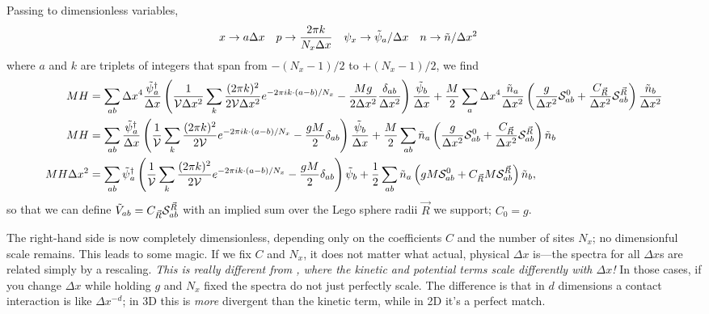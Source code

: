 Passing to dimensionless variables,
\begin{align}
	x & \rightarrow a \Delta x
	&
	p &\rightarrow \frac{2\pi k}{N_x \Delta x}
	&
	\psi_x & \rightarrow \tilde{\psi}_a / \Delta x
	&
	n &\rightarrow \tilde{n} / \Delta x^2
\end{align}
where $a$ and $k$ are triplets of integers that span from $-(N_x-1)/2$ to $+(N_x-1)/2$, we find
\begin{align}
	MH &= 
		\sum_{ab}\Delta x^4 \frac{\tilde{\psi}{}^{\dagger}_a}{\Delta x} \left(
				\frac{1}{\mathcal{V} \Delta x^2} \sum_{k} \frac{(2\pi k)^2}{2 \mathcal{V} \Delta x^2} e^{-2\pi i k \cdot(a-b)/N_x} 
				- \frac{Mg}{2\Delta x^2} \frac{\delta_{ab}}{\Delta x^2}
			\right) \frac{\tilde{\psi}_b}{\Delta x}
		+ \frac{M}{2} \sum_{a} \Delta x^4 \frac{\tilde{n}_a}{\Delta x^2} \left(
				\frac{g}{\Delta x^2} \mathcal{S}^{0}_{ab}
				+ \frac{C_{\vec{R}}}{\Delta x^2} \mathcal{S}^{\vec{R}}_{ab}
			\right) \frac{\tilde{n}_b}{\Delta x^2}
	\\
	MH &=
		\sum_{ab}\frac{\tilde{\psi}{}^{\dagger}_a}{\Delta x} \left(
			\frac{1}{\mathcal{V}} \sum_{k} \frac{(2\pi k)^2}{2 \mathcal{V}} e^{-2\pi i k \cdot(a-b)/N_x} 
			- \frac{gM}{2} \delta_{ab}
			\right) \frac{\tilde{\psi}_b}{\Delta x}
		+ \frac{M}{2} \sum_{ab} \tilde{n}_a \left(
				\frac{g}{\Delta x^2} \mathcal{S}^{0}_{ab}
				+ \frac{C_{\vec{R}}}{\Delta x^2} \mathcal{S}^{\vec{R}}_{ab}
			\right) \tilde{n}_b
	\\
	MH \Delta x^2 &=
		\sum_{ab} \tilde{\psi}{}^{\dagger}_a \left(
			\frac{1}{\mathcal{V}} \sum_{k} \frac{(2\pi k)^2}{2 \mathcal{V}} e^{-2\pi i k \cdot(a-b)/N_x} 
			- \frac{gM}{2} \delta_{ab}
			\right) \tilde{\psi}_b
		+ \frac{1}{2} \sum_{ab} \tilde{n}_a \left(
				gM \mathcal{S}^{0}_{ab}
				+ C_{\vec{R}} M \mathcal{S}^{\vec{R}}_{ab}
			\right) \tilde{n}_b,
\end{align}
so that we can define $\tilde{V}_{ab} = C_{\vec{R}} \mathcal{S}^{\vec{R}}_{ab}$ with an implied sum over the Lego sphere radii $\vec{R}$ we support; $C_0 = g$.

The right-hand side is now completely dimensionless, depending only on the coefficients $C$ and the number of sites $N_x$; no dimensionful scale remains.
This leads to some magic.
If we fix $C$ and $N_x$, it does not matter what actual, physical $\Delta x$ is---the spectra for all $\Delta x$s are related simply by a rescaling.
\emph{This is really different from , where the kinetic and potential terms scale differently with $\Delta x$!}
In those cases, if you change $\Delta x$ while holding $g$ and $N_x$ fixed the spectra do not just perfectly scale.
The difference is that in $d$ dimensions a contact interaction is like $\Delta x^{-d}$; in 3D this is \emph{more} divergent than the kinetic term, while in 2D it's a perfect match.

